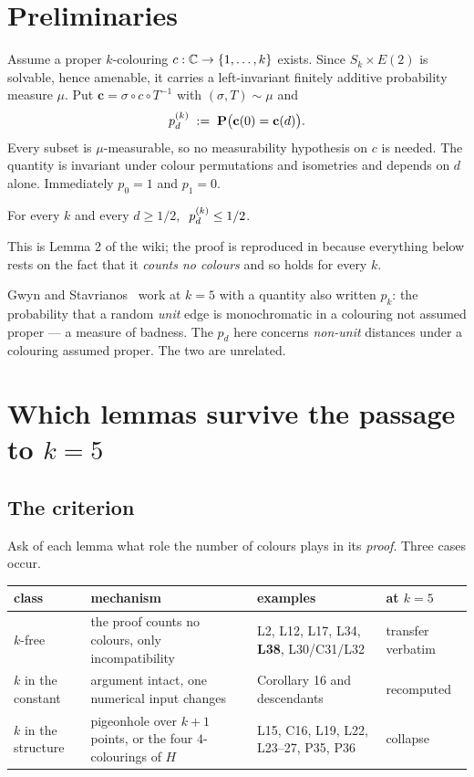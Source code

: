 \section{Preliminaries}

Assume a proper $k$-colouring $c:\mathbb{C}\to\{1,\dots,k\}$ exists. Since
$S_k\times E(2)$ is solvable, hence amenable, it carries a left-invariant
finitely additive probability measure $\mu$. Put $\mathbf{c}=\sigma\circ c\circ
T^{-1}$ with $(\sigma,T)\sim\mu$ and
\[
p^{(k)}_{d} \;:=\; \mathbf{P}\big(\mathbf{c}(0)=\mathbf{c}(d)\big).
\]
Every subset is $\mu$-measurable, so no measurability hypothesis on $c$ is
needed. The quantity is invariant under colour permutations and isometries and
depends on $d$ alone. Immediately $p_0=1$ and $p_1=0$.

\begin{proposition}
\label{prop:half}
For every $k$ and every $d\ge1/2$, $\ p^{(k)}_{d}\le 1/2$.
\end{proposition}

This is Lemma 2 of the wiki; the proof is reproduced in 
because everything below rests on the fact that it \emph{counts no colours} and
so holds for every $k$.

\begin{remark}
Gwyn and Stavrianos~\cite{GwynStavrianos2020} work at $k=5$ with a quantity also
written $p_k$: the probability that a random \emph{unit} edge is monochromatic
in a colouring not assumed proper --- a measure of badness. The $p_d$ here
concerns \emph{non-unit} distances under a colouring assumed proper. The two
are unrelated.
\end{remark}

\section{Which lemmas survive the passage to $k=5$}

\subsection{The criterion}

Ask of each lemma what role the number of colours plays in its \emph{proof}.
Three cases occur.

\begin{center}
\begin{tabular}{@{}lp{4.9cm}p{3.5cm}l@{}}
\toprule
class & mechanism & examples & at $k=5$ \\
\midrule
$k$-free & the proof counts no colours, only incompatibility
& L2, L12, L17, L34, \textbf{L38}, L30/C31/L32 & transfer verbatim \\
$k$ in the constant & argument intact, one numerical input changes
& Corollary 16 and descendants & recomputed \\
$k$ in the structure & pigeonhole over $k+1$ points, or the four
$4$-colourings of $H$ & L15, C16, L19, L22, L23--27, P35, P36 & collapse \\
\bottomrule
\end{tabular}
\end{center}

